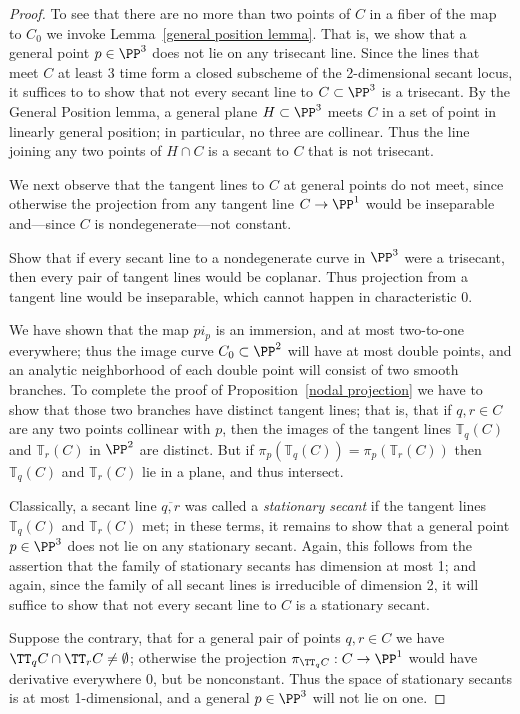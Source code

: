 \begin{proof}
To see that there are no more than two points of $C$ in a fiber of the map to $C_0$ we invoke Lemma~\ref{general position lemma}. That is, we show that a general point $p \in \PP^3$ does not lie on any trisecant line. Since the lines that meet $C$ at least 3 time form a closed subscheme of the 2-dimensional secant locus, it suffices to to show that not every secant line to $C \subset \PP^3$ is a trisecant. By the General Position lemma, a general plane $H \subset \PP^3$ meets $C$ in a set of point in linearly general position; in particular, no three are collinear. Thus the line joining any two points of $H\cap C$ is a secant  to $C$ that is not  trisecant.

We next observe that the tangent lines to $C$ at general points do not meet, since otherwise the projection from any tangent line
$C\to \PP^1$ would be inseparable and---since $C$ is nondegenerate---not constant.
\begin{exercise}
Show that if every secant line to a nondegenerate curve in $\PP^3$ were a trisecant, then every pair of tangent lines would be coplanar. Thus projection from a tangent line would be inseparable, which cannot happen in characteristic 0.
\end{exercise}

We have shown that the map $pi_p$ is an immersion, and at most two-to-one everywhere; thus the image curve $C_0 \subset \PP^2$ will have at most double points, and an analytic neighborhood of each double point will consist of two smooth branches.
To complete the proof of Proposition~\ref{nodal projection} we have to show that those two branches have distinct tangent lines; that is, that
if $q, r \in C$ are any two points collinear with $p$, then the images of the tangent lines ${\mathbb T}_q(C)$ and ${\mathbb T}_r(C)$ in $\PP^2$ are distinct. But if  $\pi_p({\mathbb T}_q(C)) = \pi_p({\mathbb T}_r(C))$ then  ${\mathbb T}_q(C)$ and ${\mathbb T}_r(C)$ lie in a plane, and thus intersect.

Classically, a secant line $\overline{q,r}$ was called a \emph{stationary secant} if the tangent lines ${\mathbb T}_q(C)$ and ${\mathbb T}_r(C)$ met; in these terms, it remains to show that a general point $p \in \PP^3$ does not lie on any stationary secant. Again, this follows from the assertion that the family of stationary secants has dimension at most 1; and again, since the family of all secant lines is irreducible of dimension 2, it will suffice to show that not every secant line to $C$ is a stationary secant.

Suppose the contrary, that for a general pair of points $q, r \in C$ we have $\TT_qC \cap \TT_rC \neq \emptyset$; otherwise the projection $\pi_{\TT_qC} : C \to \PP^1$ would have derivative everywhere 0, but be nonconstant. Thus the space of  stationary secants is at most 1-dimensional, and a general $p \in \PP^3$ will not lie on one.
\end{proof}


